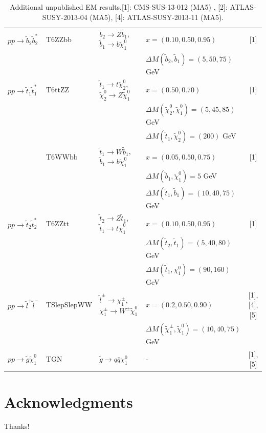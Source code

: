 \documentclass[a4paper,11pt]{article}
\begin{document}
\begin{table}
\begin{tabular}{ l | l  l  l  c }
		
		$p p \rightarrow \tilde b_2 \tilde b_2^*$ & T6ZZbb & $\tilde b_2 \rightarrow Z \tilde b_1$, $\tilde b_1 \rightarrow b \tilde \chi^0_1$ & $x =(0.10,0.50,0.95)$  & [1] \\
		& & & $\Delta M(\tilde b_2,\tilde b_1)=(5,50,75)$ GeV & \\   \midrule
		
		$p p \rightarrow \tilde t_1 \tilde t_1^*$  & T6ttZZ & $\tilde t_1 \rightarrow t \tilde\chi_2 ^0$, $\tilde \chi_2 ^0 \rightarrow Z \tilde \chi^0_1$ & $x =(0.50,0.70)$  & [1] \\
		& & & $\Delta M(\tilde \chi_2^{0}, \tilde \chi_1 ^0)=(5,45,85)$ GeV & \\ 
		& & & $\Delta M(\tilde t_1, \tilde \chi_2 ^0)=(200)$ GeV & \\ 
		
		& T6WWbb & $\tilde t_1 \rightarrow W \tilde b_1 $, $\tilde b_1 \rightarrow b \tilde \chi^0_1$ & $x =(0.05,0.50,0.75)$  & [1] \\
		& & & $\Delta M(\tilde b_1, \tilde \chi_1 ^0)=5$ GeV & \\ 
		& & & $\Delta M(\tilde t_1, \tilde b_1 )=(10,40,75)$ GeV & \\ \midrule
		
		$p p \rightarrow \tilde t_2 \tilde t_2^*$ & T6ZZtt & $\tilde t_2 \rightarrow Z \tilde t_1$, $\tilde t_1 \rightarrow t \tilde \chi^0_1$ & $x =(0.10,0.50,0.95)$  & [1] \\
		& & & $\Delta M(\tilde t_2,\tilde t_1)=(5,40,80)$ GeV & \\ 
		& & & $\Delta M(\tilde t_1,\chi^0_1)=(90,160)$ GeV & \\ \midrule
		
		$p p \rightarrow \tilde l^+ \tilde l^-$ & TSlepSlepWW & $  \tilde l ^{\pm}  \rightarrow \chi _1^{\pm}$, $ \chi _1^{\pm} \rightarrow W^{\pm} \tilde\chi^0_1$ & $x=(0.2,0.50,0.90)$ & [1],[4],[5]  \\
		& & 																			& $\Delta M(\tilde\chi^\pm_1,\tilde\chi^0_1) = (10,40,75)$ GeV            & \\ \midrule
		$p p \rightarrow \tilde g  \tilde \chi _1 ^0$ & TGN & $\tilde g \rightarrow q \bar q \chi _1 ^ 0$ & -  & [1],[5] \\ 
		\bottomrule \bottomrule
	\end{tabular}
	\caption{Additional unpublished EM results.[1]: CMS-SUS-13-012 (MA5) , [2]: ATLAS-SUSY-2013-04 (MA5), [4]: ATLAS-SUSY-2013-11 (MA5).} 
	\label{extra_sms}
\end{table}



\section*{Acknowledgments}
Thanks!
%


\end{document}

